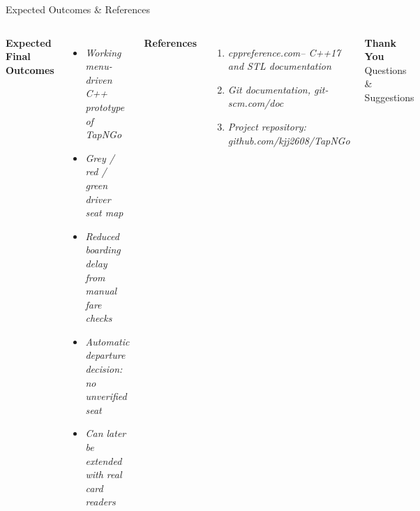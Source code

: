 \documentclass[aspectratio=169,11pt]{beamer}
\newcommand{\smallnote}[1]{%
\vspace{0.08cm}
{\scriptsize\color{GEUGrey}#1}
}
\newcommand{\placeholder}[1]{%
\textit{\color{GEUGrey}#1}
}
\begin{document}
\begin{frame}{Expected Outcomes \& References}

\begin{columns}[T,totalwidth=\textwidth]


\textbf{\color{GEUBlue}Expected Final Outcomes}

\begin{itemize}\itemsep3pt
\item \placeholder{Working menu-driven C++ prototype of TapNGo}
\item \placeholder{Grey / red / green driver seat map}
\item \placeholder{Reduced boarding delay from manual fare checks}
\item \placeholder{Automatic departure decision: no unverified seat}
\item \placeholder{Can later be extended with real card readers}
\end{itemize}


\textbf{\color{GEUBlue}References}

\begin{enumerate}\itemsep3pt
\item \placeholder{cppreference.com– C++17 and STL documentation}
\item \placeholder{Git documentation, git-scm.com/doc}
\item \placeholder{Project repository: github.com/kjj2608/TapNGo}
\end{enumerate}

\vfill

\begin{center}

\colorbox{GEUBlue}{
\parbox{.78\textwidth}{
\centering
\color{white}
\textbf{Thank You}\\
Questions \& Suggestions
}}

\end{center}

\end{columns}

\vfill


\end{frame}
\end{document}

